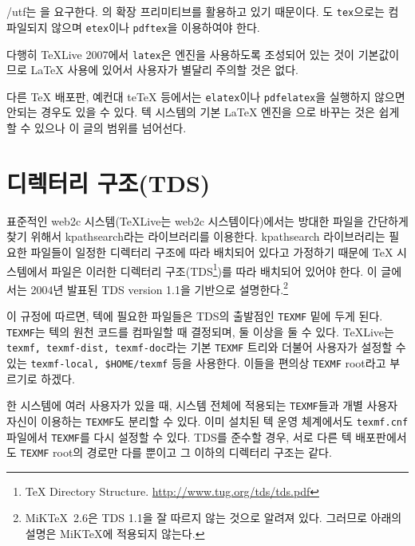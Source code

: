 \section{\protect\eTeX}

\kotex/utf는 \eTeX 을 요구한다. \eTeX 의 확장 프리미티브를
활용하고 있기 때문이다. 도 \texttt{tex}으로는
컴파일되지 않으며 \texttt{etex}이나 \texttt{pdftex}을 이용하여야
한다.

다행히 \TeX{}Live 2007에서 \texttt{latex}은 \eTeX{} 엔진을
사용하도록 조성되어 있는 것이 기본값이므로 \LaTeX{} 사용에
있어서 사용자가 별달리 주의할 것은 없다. 

다른 \TeX{} 배포판, 예컨대 te\TeX{} 등에서는 \texttt{elatex}이나
\texttt{pdfelatex}을
실행하지 않으면 안되는 경우도 있을 수 있다. 텍 시스템의 기본
\LaTeX{} 엔진을 \eTeX 으로 바꾸는 것은 쉽게 할 수 있으나
이 글의 범위를 넘어선다. 

\section{디렉터리 구조(TDS)}

표준적인 web2c 시스템(\TeX{}Live는 web2c 시스템이다)에서는
방대한 파일을 간단하게 찾기 위해서 kpathsearch라는 라이브러리를
이용한다. kpathsearch 라이브러리는 필요한 파일들이 일정한 디렉터리
구조에 따라 배치되어 있다고 가정하기 때문에 \TeX{} 시스템에서
파일은 이러한 디렉터리 구조(TDS\footnote{%
  TeX Directory Structure. \url{http://www.tug.org/tds/tds.pdf}})를
따라 배치되어 있어야 한다. 이 글에서는 2004년 발표된
TDS version 1.1을 기반으로 설명한다.\footnote{%
  MiK\TeX~2.6은 TDS 1.1을 잘 따르지 않는 것으로 알려져
  있다. 그러므로 아래의 설명은 MiK\TeX 에 적용되지 않는다.}

이 규정에 따르면, 텍에 필요한 파일들은 TDS의 출발점인 \texttt{TEXMF}
밑에 두게 된다.
\texttt{TEXMF}는 텍의 원천 코드를 컴파일할 때
결정되며, 둘 이상을 둘 수 있다. \TeX{}Live는 \texttt{texmf,
texmf-dist, texmf-doc}라는 기본 \texttt{TEXMF} 트리와 더불어
사용자가 설정할 수 있는 \texttt{texmf-local, \$HOME/texmf} 등을
사용한다. 이들을 편의상 \texttt{TEXMF} root라고 부르기로 하겠다.

한 시스템에 여러 사용자가 있을 때, 시스템 전체에 적용되는 \texttt{TEXMF}들과
개별 사용자 자신이 이용하는 \texttt{TEXMF}도 분리할 수 있다. 
이미 설치된 텍 운영 체계에서도 \texttt{texmf.cnf} 파일에서
\texttt{TEXMF}를 다시 설정할 수 있다.  TDS를 준수할 경우, 서로 다른
텍 배포판에서도 \texttt{TEXMF} root의 경로만 다를 뿐이고 그
이하의 디렉터리 구조는 같다.

